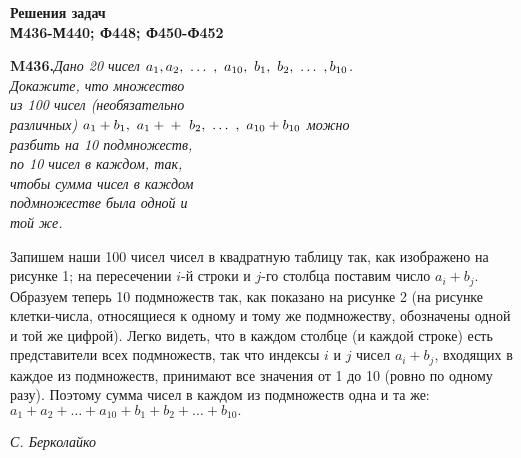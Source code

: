 \begin{center}
\vspace*{0.1cm}
\huge\textbf{Решения задач}\\
\Large\textbf{М436-М440; Ф448; Ф450-Ф452}
\end{center}

\noindent
\begin{minipage}[t]{0.31\textwidth}
\textbf{M436.}\qquad\textit{Дано 20 чисел $a_1, \\ a_2, \ \dots \ , \ a_{10}, \ b_1, \ b_2, \ \dots \ , b_{10}$. \\Докажите, что множество \\ из 100 чисел (необязательно \\ различных) $a_1 + b_1, \ a_1 + \\ + \ b_2, \ \dots \ , \ a_{10} + b_{10}$ можно \\ разбить на 10 подмножеств, \\ по 10 чисел в каждом, так,  \\чтобы сумма чисел в каждом \\ подмножестве была одной и \\ той же.}
\end{minipage}
\hfill
\begin{minipage}[t]{0.67\textwidth}
Запишем наши 100 чисел чисел в квадратную таблицу так, как изображено  на рисунке 1; на пересечении $i$-й строки и $j$-го столбца поставим число $a_i + b_j$. 
Образуем теперь 10 подмножеств так, как показано на рисунке 2 (на рисунке клетки-числа, относящиеся к одному и тому же подмножеству, обозначены одной и той же цифрой).
Легко видеть, что в каждом столбце (и каждой строке) есть представители всех подмножеств, так что индексы $i$ и $j$ чисел $a_i + b_j$, входящих в каждое из подмножеств, принимают все значения от 1 до 10 (ровно по одному разу). Поэтому сумма чисел в каждом из подмножеств одна и та же: $a_1 + a_2 + \dots + a_{10} + b_1 + b_2 + \dots + b_{10}.$
\begin{flushright}
\textit{С. Берколайко}
\end{flushright}
\end{minipage}

